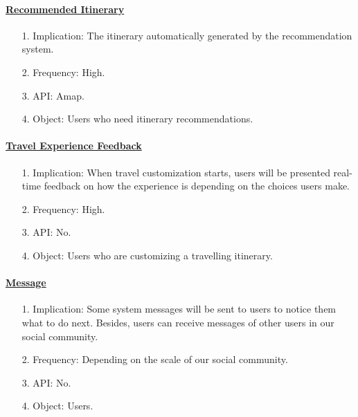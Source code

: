 \documentclass[10pt]{article}
\begin{document}
\paragraph{\underline{Recommended Itinerary}}
\begin{itemize}
  \item[1.] Implication: The itinerary automatically generated by the recommendation system.
  \item[2.] Frequency: High.
  \item[3.] API: Amap.  
  \item[4.] Object: Users who need itinerary recommendations. 
\end{itemize}

\paragraph{\underline{Travel Experience Feedback}}
\begin{itemize}
  \item[1.] Implication: When travel customization starts, users will be presented real-time feedback on how the experience is depending on the choices users make.
  \item[2.] Frequency: High.
  \item[3.] API: No.  
  \item[4.] Object: Users who are customizing a travelling itinerary. 
\end{itemize}

\paragraph{\underline{Message}}
\begin{itemize}
  \item[1.] Implication: Some system messages will be sent to users to notice them what to do next. Besides, users can receive messages of other users in our social community.
  \item[2.] Frequency: Depending on the scale of our social community. 
  \item[3.] API: No. 
  \item[4.] Object: Users. 
\end{itemize}
\end{document}
